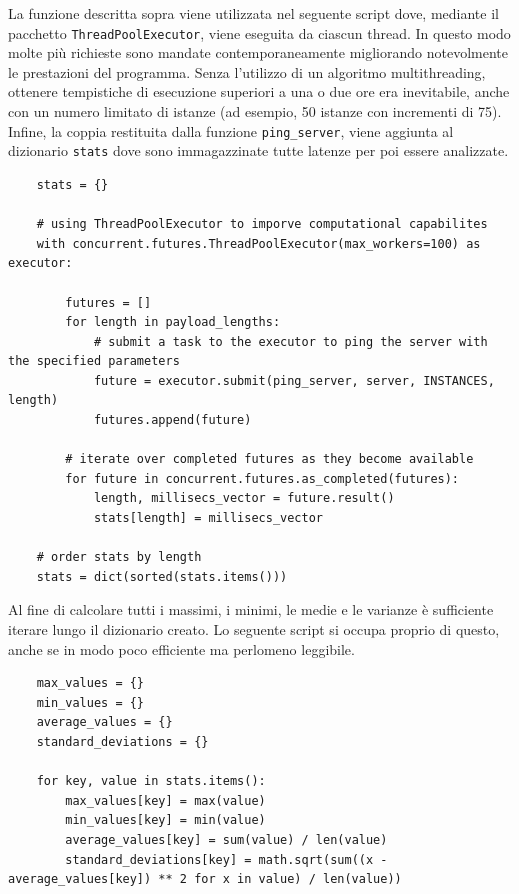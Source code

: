 \noindent La funzione descritta sopra viene utilizzata nel seguente script dove, mediante il pacchetto \texttt{ThreadPoolExecutor}, viene eseguita da ciascun thread. In questo modo molte più richieste sono mandate contemporaneamente migliorando notevolmente le prestazioni del programma. Senza l'utilizzo di un algoritmo multithreading, ottenere tempistiche di esecuzione superiori a una o due ore era inevitabile, anche con un numero limitato di istanze (ad esempio, 50 istanze con incrementi di 75). Infine, la coppia restituita dalla funzione \texttt{ping\_server}, viene aggiunta al dizionario \texttt{stats} dove sono immagazzinate tutte latenze per poi essere analizzate.

\begin{lstlisting}
    stats = {}
    
    # using ThreadPoolExecutor to imporve computational capabilites
    with concurrent.futures.ThreadPoolExecutor(max_workers=100) as executor:
        
        futures = []
        for length in payload_lengths:
            # submit a task to the executor to ping the server with the specified parameters
            future = executor.submit(ping_server, server, INSTANCES, length)
            futures.append(future)
            
        # iterate over completed futures as they become available
        for future in concurrent.futures.as_completed(futures):
            length, millisecs_vector = future.result()
            stats[length] = millisecs_vector
    
    # order stats by length
    stats = dict(sorted(stats.items()))
\end{lstlisting}

\noindent Al fine di calcolare tutti i massimi, i minimi, le medie e le varianze è sufficiente iterare lungo il dizionario creato. Lo seguente script si occupa proprio di questo, anche se in modo poco efficiente ma perlomeno leggibile.

\begin{lstlisting}
    max_values = {}
    min_values = {}
    average_values = {}
    standard_deviations = {}

    for key, value in stats.items():
        max_values[key] = max(value)
        min_values[key] = min(value)
        average_values[key] = sum(value) / len(value)
        standard_deviations[key] = math.sqrt(sum((x - average_values[key]) ** 2 for x in value) / len(value))
\end{lstlisting}

